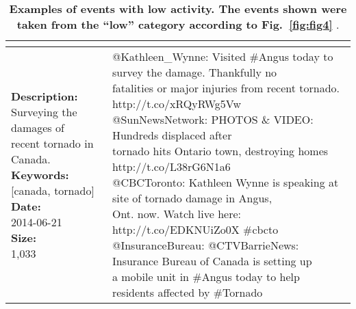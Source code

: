 \begin{table}
{\begin{tabular*}{1\linewidth}{p{5cm}p{5cm}}
{        %
      }
      \\
            \midrule
      \pbox{20cm}{\textbf{Description:}\\Surveying the damages of \\ recent tornado in Canada. \vspace{.1cm}\\
        \textbf{Keywords:}\\ {[}canada, tornado{]}\vspace{.1cm}\\
        \textbf{Date:}\\ 2014-06-21 \vspace{.1cm}\\
        \textbf{Size:}\\ 1,033}
      & \pbox{20cm}{
        @Kathleen\_Wynne: Visited \#Angus today to survey the damage. Thankfully no \\fatalities or major injuries from recent tornado. http://t.co/xRQyRWg5Vw\vspace{.1cm}\\
        @SunNewsNetwork: PHOTOS \& VIDEO: Hundreds displaced after \\ tornado hits Ontario town, destroying homes http://t.co/L38rG6N1a6\vspace{.1cm}\\
        @CBCToronto: Kathleen Wynne is speaking at site of tornado damage in Angus, \\Ont. now. Watch live here: http://t.co/EDKNUiZo0X \#cbcto\vspace{.1cm}\\
        @InsuranceBureau: @CTVBarrieNews: Insurance Bureau of Canada is setting up \\a mobile unit in \#Angus today to help residents affected by \#Tornado}
      \\
      \bottomrule
    \end{tabular*}
  }
  \caption{\textbf{
                Examples of events with low activity. The events
      shown were taken from the ``low'' category according to
Fig.~\ref{fig:fig4}}
          .}
  \label{table:low-impact-sample}
\end{table}

